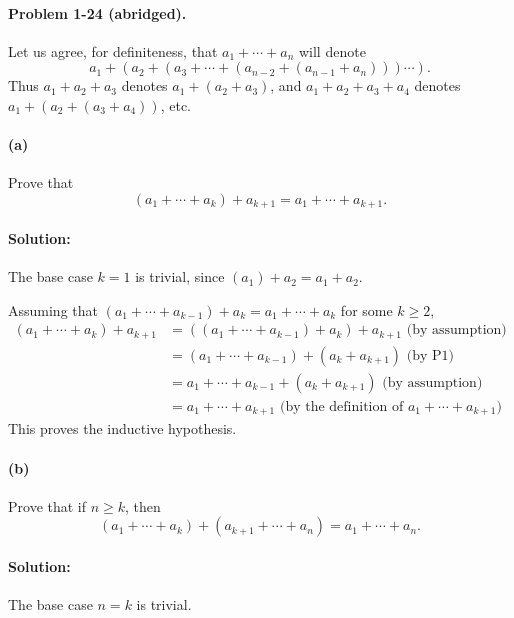 \documentclass{article}
\begin{document}
\paragraph{Problem 1-24 (abridged).} Let us agree, for definiteness, that $a_1
+ \cdots + a_n$ will denote \begin{equation*}
  a_1 + (a_2 + (a_3 + \cdots + (a_{n-2} + (a_{n-1} + a_n)))\cdots).
\end{equation*}
Thus $a_1 + a_2 + a_3$ denotes $a_1 + (a_2 + a_3)$, and $a_1 + a_2 + a_3 + a_4$
denotes $a_1 + (a_2 + (a_3 + a_4))$, etc.

\paragraph{(a)} Prove that \begin{equation*}
  (a_1 + \cdots + a_k) + a_{k+1} = a_1 + \cdots + a_{k+1}.
\end{equation*}

\paragraph{Solution:} The base case $k = 1$ is trivial, since $(a_1) + a_2
= a_1 + a_2$.

Assuming that $(a_1 + \cdots + a_{k-1}) + a_k = a_1 + \cdots + a_k$ for some $k
\geq 2$, \begin{align*}
  (a_1 + \cdots + a_k) + a_{k+1} &= ((a_1 + \cdots + a_{k-1}) + a_k) + a_{k+1}
  \text{ (by assumption)} \\
    &= (a_1 + \cdots + a_{k-1}) + (a_k + a_{k+1}) \text{ (by P1)} \\
    &= a_1 + \cdots + a_{k-1} + (a_k + a_{k+1}) \text{ (by assumption)} \\
    &= a_1 + \cdots + a_{k+1} \text{ (by the definition of } a_1 + \cdots +
    a_{k+1} \text{)}
\end{align*} This proves the inductive hypothesis.

\paragraph{(b)} Prove that if $n \geq k$, then \begin{equation*}
  (a_1 + \cdots + a_k) + (a_{k+1} + \cdots + a_n) = a_1 + \cdots + a_n.
\end{equation*}

\paragraph{Solution:} The base case $n = k$ is trivial.
\end{document}
